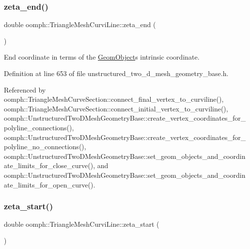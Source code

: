 \subsubsection{\texorpdfstring{zeta\+\_\+end()}{zeta\_end()}}
{\footnotesize\ttfamily double oomph\+::\+Triangle\+Mesh\+Curvi\+Line\+::zeta\+\_\+end (\begin{DoxyParamCaption}{ }\end{DoxyParamCaption})\hspace{0.3cm}{\ttfamily [inline]}}



End coordinate in terms of the \hyperlink{classoomph_1_1GeomObject}{Geom\+Object}\textquotesingle{}s intrinsic coordinate. 



Definition at line 653 of file unstructured\+\_\+two\+\_\+d\+\_\+mesh\+\_\+geometry\+\_\+base.\+h.



Referenced by oomph\+::\+Triangle\+Mesh\+Curve\+Section\+::connect\+\_\+final\+\_\+vertex\+\_\+to\+\_\+curviline(), oomph\+::\+Triangle\+Mesh\+Curve\+Section\+::connect\+\_\+initial\+\_\+vertex\+\_\+to\+\_\+curviline(), oomph\+::\+Unstructured\+Two\+D\+Mesh\+Geometry\+Base\+::create\+\_\+vertex\+\_\+coordinates\+\_\+for\+\_\+polyline\+\_\+connections(), oomph\+::\+Unstructured\+Two\+D\+Mesh\+Geometry\+Base\+::create\+\_\+vertex\+\_\+coordinates\+\_\+for\+\_\+polyline\+\_\+no\+\_\+connections(), oomph\+::\+Unstructured\+Two\+D\+Mesh\+Geometry\+Base\+::set\+\_\+geom\+\_\+objects\+\_\+and\+\_\+coordinate\+\_\+limits\+\_\+for\+\_\+close\+\_\+curve(), and oomph\+::\+Unstructured\+Two\+D\+Mesh\+Geometry\+Base\+::set\+\_\+geom\+\_\+objects\+\_\+and\+\_\+coordinate\+\_\+limits\+\_\+for\+\_\+open\+\_\+curve().

\mbox{\label{classoomph_1_1TriangleMeshCurviLine_a6c0067c06cce020c85e3fe9b1737ce57}} 
\subsubsection{\texorpdfstring{zeta\+\_\+start()}{zeta\_start()}}
{\footnotesize\ttfamily double oomph\+::\+Triangle\+Mesh\+Curvi\+Line\+::zeta\+\_\+start (\begin{DoxyParamCaption}{ }\end{DoxyParamCaption})\hspace{0.3cm}{\ttfamily [inline]}}



